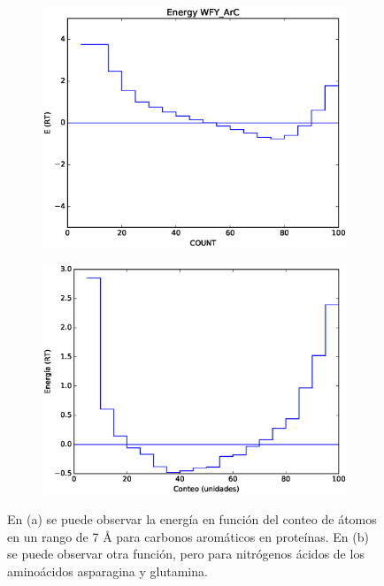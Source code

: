 \begin{figure}[p]
\centering
\begin{subfigure}{.8\textwidth}
\centering
\includegraphics[width=\textwidth]{figures/prot_pot/coarse/aromatic.eps}
\caption{}
\end{subfigure}

\begin{subfigure}{.8\textwidth}
\centering
\includegraphics[width=\textwidth]{figures/prot_pot/coarse/nh_acids.eps}
\caption{}
\end{subfigure}
\caption[Ejemplos de funciones de energía para conteo de átomos en proteínas]{En (a) se puede observar la energía en función del conteo de átomos en un rango de 7 \si{\angstrom} para carbonos aromáticos en proteínas. En (b) se puede observar otra función, pero para nitrógenos ácidos de los aminoácidos asparagina y glutamina.}
\label{fig:inteng}
\end{figure}
\cleardoublepage

